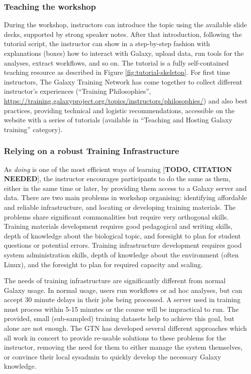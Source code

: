 \documentclass[10pt,letterpaper]{article}
\begin{document}
\subsubsection*{Teaching the workshop}
During the workshop, instructors can introduce the topic using the available slide decks, supported by strong speaker notes. After that introduction, following the tutorial script, the instructor can show in a step-by-step fashion with explanations (boxes) how to interact with Galaxy, upload data, run tools for the analyses, extract workflows, and so on. The tutorial is a fully self-contained teaching resource as described in Figure \ref{fig:tutorial-skeleton}. For first time instructors, The Galaxy Training Network has come together to collect different instructor’s experiences (``Training Philosophies'', \url{https://training.galaxyproject.org/topics/instructors/philosophies/}) and also best practices, providing technical and logistic recommendations, accessible on the website with a series of tutorials (available in ``Teaching and Hosting Galaxy training'' category).

\subsubsection*{Relying on a robust Training Infrastructure}
As \emph{doing} is one of the most efficient ways of learning [\textbf{TODO, CITATION NEEDED}], the instructor encourages participants to do the same as them, either in the same time or later, by providing them access to a Galaxy server and data. There are two main problems in workshop organising: identifying affordable and reliable infrastructure, and locating or developing training materials. The problems share significant commonalities but require very orthogonal skills.
Training materials development requires good pedagogical and writing skills, depth of knowledge about the biological topic, and foresight to plan for student questions or potential errors. Training infrastructure development requires good system administration skills, depth of knowledge about the environment (often Linux), and the foresight to plan for required capacity and scaling.

The needs of training infrastructure are significantly different from normal Galaxy usage. In normal usage, users run workflows or ad hoc analyses, but can accept 30 minute delays in their jobs being processed. A server used in training must process within 5-15 minutes or the course will be impractical to run. 
The provided, small (sub-sampled) training datasets help to achieve this goal, but alone are not enough. The GTN has developed several different approaches which all work in concert to provide re-usable solutions to these problems for the instructor, removing the need for them to either manage the system themselves, or convince their local sysadmin to quickly develop the necessary Galaxy knowledge.
\end{document}

